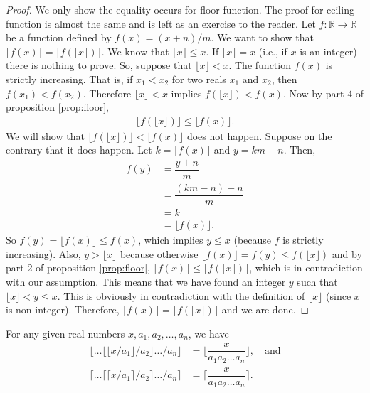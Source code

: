 \documentclass[12pt]{subfile}
\begin{document}
\begin{proof}
	We only show the equality occurs for floor function. The proof for ceiling function is almost the same and is left as an exercise to the reader. Let $f: \mathbb{R} \to \mathbb{R}$ be a function defined by $f(x)=(x+n)/m$. We want to show that $\lfloor f(x) \rfloor = \lfloor f(\lfloor x \rfloor) \rfloor$. We know that $\lfloor x \rfloor \leq x$. If $\lfloor x \rfloor = x$ (i.e., if $x$ is an integer) there is nothing to prove. So, suppose that $\lfloor x \rfloor < x$. The function $f(x)$ is strictly increasing. That is, if $x_1<x_2$ for two reals $x_1$ and $x_2$, then $f(x_1) < f(x_2)$. Therefore $\lfloor x \rfloor < x$ implies $f(\lfloor x \rfloor) < f(x)$. Now by part $4$ of proposition \ref{prop:floor},
	\begin{align*}
	\bigg\lfloor f(\lfloor x \rfloor)\bigg\rfloor  \leq \bigg\lfloor f(x) \bigg\rfloor.
	\end{align*}
	We will show that $\lfloor f(\lfloor x \rfloor)\rfloor  < \lfloor f(x) \rfloor$ does not happen. Suppose on the contrary that it does happen. Let $k =  \lfloor f(x) \rfloor$ and $y=km-n$. Then,
	\begin{align*}
	f(y) &= \dfrac{y+n}{m}\\
	&= \dfrac{(km-n)+n}{m}\\
	&= k\\
	&= \lfloor f(x) \rfloor.
	\end{align*}
	So $f(y)=\lfloor f(x) \rfloor \leq f(x)$, which implies $y \leq x$ (because $f$ is strictly increasing). Also, $y > \lfloor x \rfloor$ because otherwise $\lfloor f(x) \rfloor = f(y) \leq  f(\lfloor x \rfloor)$ and by part $2$ of proposition \ref{prop:floor}, $\lfloor f(x) \rfloor \leq \lfloor f(\lfloor x \rfloor)\rfloor$, which is in contradiction with our assumption. This means that we have found an integer $y$ such that $\lfloor x \rfloor < y \leq x$. This is obviously in contradiction with the definition of $\lfloor x \rfloor$ (since $x$ is non-integer). Therefore, $\lfloor f(x) \rfloor = \lfloor f(\lfloor x \rfloor) \rfloor$ and we are done.
\end{proof}

\begin{corollary}
	For any given real numbers $x, a_1, a_2, \ldots, a_n$, we have
	\begin{align*}
	\Bigg\lfloor \ldots \Big\lfloor \big\lfloor x/a_1 \big\rfloor/a_2 \Big\rfloor \ldots/a_n \Bigg\rfloor &= \Bigg\lfloor \dfrac{x}{a_1a_2\ldots a_n}\Bigg\rfloor, \quad \text{and}\\
	\Bigg\lceil \ldots \Big\lceil \big\lceil x/a_1 \big\rceil/a_2 \Big\rceil \ldots/a_n \Bigg\rceil &= \Bigg\lceil \dfrac{x}{a_1a_2\ldots a_n}\Bigg\rceil.
	\end{align*}
\end{corollary}
\end{document}
